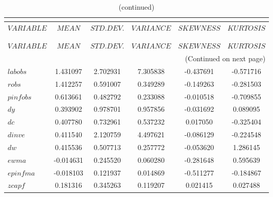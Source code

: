  
\begin{center}
\begin{longtable}{lccccc} 
\caption{MOMENTS OF SIMULATED VARIABLES}\\
 \label{Table:sim_moments}\\
\toprule 
$VARIABLE  $	 & 	 $            MEAN$	 & 	 $       STD. DEV.$	 & 	 $        VARIANCE$	 & 	 $        SKEWNESS$	 & 	 $        KURTOSIS$\\
\midrule \endfirsthead 
\caption{(continued)}\\
 \toprule \\ 
$VARIABLE  $	 & 	 $            MEAN$	 & 	 $       STD. DEV.$	 & 	 $        VARIANCE$	 & 	 $        SKEWNESS$	 & 	 $        KURTOSIS$\\
\midrule \endhead 
\midrule \multicolumn{6}{r}{(Continued on next page)} \\ \bottomrule \endfoot 
\bottomrule \endlastfoot 
$labobs    $	 & 	        1.431097	 & 	        2.702931	 & 	        7.305838	 & 	       -0.437691	 & 	       -0.571716 \\ 
$robs      $	 & 	        1.412257	 & 	        0.591007	 & 	        0.349289	 & 	       -0.149263	 & 	       -0.281503 \\ 
$pinfobs   $	 & 	        0.613661	 & 	        0.482792	 & 	        0.233088	 & 	       -0.010518	 & 	       -0.709855 \\ 
$dy        $	 & 	        0.393902	 & 	        0.978701	 & 	        0.957856	 & 	       -0.031692	 & 	        0.089095 \\ 
$dc        $	 & 	        0.407780	 & 	        0.732961	 & 	        0.537232	 & 	        0.017050	 & 	       -0.325404 \\ 
$dinve     $	 & 	        0.411540	 & 	        2.120759	 & 	        4.497621	 & 	       -0.086129	 & 	       -0.224548 \\ 
$dw        $	 & 	        0.415536	 & 	        0.507713	 & 	        0.257772	 & 	       -0.053620	 & 	        1.286145 \\ 
$ewma      $	 & 	       -0.014631	 & 	        0.245520	 & 	        0.060280	 & 	       -0.281648	 & 	        0.595639 \\ 
$epinfma   $	 & 	       -0.018103	 & 	        0.121937	 & 	        0.014869	 & 	       -0.511277	 & 	       -0.184867 \\ 
$zcapf     $	 & 	        0.181316	 & 	        0.345263	 & 	        0.119207	 & 	        0.021415	 & 	        0.027488 \\ 

\end{longtable}
\end{center}
